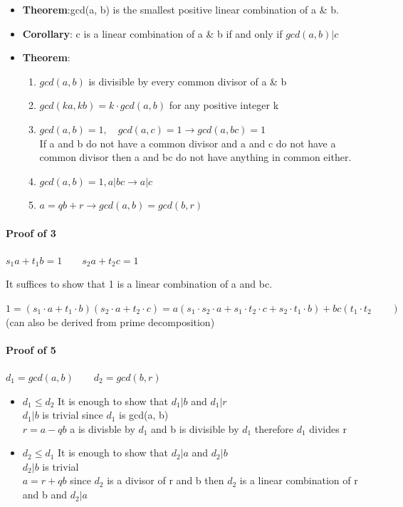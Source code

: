 \documentclass[9pt, letterpaper, oneside]{article}
\begin{document}
\begin{itemize}
    \item \textbf{Theorem}:gcd(a, b) is the smallest positive linear combination of a \& b.
    \item \textbf{Corollary}: c is a linear combination of a \& b if and only if $gcd(a, b) | c$
    \item \textbf{Theorem}:
        \begin{enumerate}
            \item $gcd(a, b)$ is divisible by every common divisor of a \& b
            \item $gcd(ka, kb) = k \cdot gcd(a, b)$ for any positive integer k
            \item $gcd(a, b) = 1, \quad gcd(a,c) = 1 \to gcd(a,bc) = 1$\\
                    If a and b do not have a common divisor and a and c do not have a common divisor then a and bc do not have anything in common either.
            \item $gcd(a, b) = 1, a | bc \to a | c$
            \item $a = qb + r \to gcd(a, b) = gcd(b, r)$
        \end{enumerate}
\end{itemize}

\paragraph{Proof of 3}

$s_1 a + t_1b = 1 \qquad s_2a + t_2c = 1$

It suffices to show that 1 is a linear combination of a and bc.

$1 = (s_1 \cdot a + t_1 \cdot b)(s_2 \cdot a + t_2 \cdot c) = a(s_1 \cdot s_2 \cdot a + s_1 \cdot t_2 \cdot c + s_2 \cdot t_1 \cdot b) + bc( t_1 \cdot t_2 \qquad)$ (can also be derived from prime decomposition)

\paragraph{Proof of 5}

$d_1 = gcd(a,b) \qquad d_2 = gcd(b,r)$

\begin{itemize}
    \item $d_1 \leq d_2$ It is enough to show that $d_1 | b$ and $d_1 | r$\\
        $d_1 | b$ is trivial since $d_1$ is gcd(a, b) \\
        $r = a - qb$ a is divisble by $d_1$ and b is divisible by $d_1$ therefore $d_1$ divides r
    \item $d_2 \leq d_1$ It is enough to show that $d_2 | a$ and $d_2 | b$\\
        $d_2| b$ is trivial \\
        $a = r + qb$ since $d_2$ is a divisor of r and b then $d_2$ is a linear combination of r and b and $d_2 | a$ 
\end{itemize}
\end{document}
